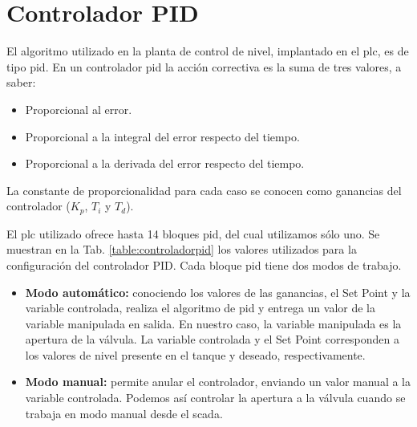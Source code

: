 \section{Controlador PID}
\label{sec:controladorpid}

El algoritmo utilizado en la planta de control de nivel, implantado en el
\gls{plc}, es de tipo \gls{pid}.
En un controlador \gls{pid} la acción correctiva es la suma de tres valores, a
saber:

\begin{itemize}
 \item Proporcional al error.
 \item Proporcional a la integral del error respecto del tiempo.
 \item Proporcional a la derivada del error respecto del tiempo.
\end{itemize}
La constante de proporcionalidad para cada caso se conocen como ganancias del
controlador ($K_p$, $T_i$ y $T_d$).

El \gls{plc} utilizado ofrece hasta 14 bloques \gls{pid}, del cual utilizamos
sólo uno.
Se muestran en la Tab. \ref{table:controladorpid} los valores utilizados para
la configuración del controlador PID.
Cada bloque \gls{pid} tiene dos modos de trabajo.
\begin{itemize}
 \item \textbf{Modo automático:} conociendo los valores de las ganancias, el
Set Point y la variable controlada, realiza el algoritmo de \gls{pid} y entrega
un valor de la variable manipulada en salida.
En nuestro caso, la variable manipulada es la apertura de la válvula.
La variable controlada y el Set Point corresponden a los valores de nivel
presente en el tanque y deseado, respectivamente.
 \item \textbf{Modo manual:} permite anular el controlador, enviando un valor
manual a la variable controlada.
Podemos así controlar la apertura a la válvula cuando se
trabaja en modo manual desde el \gls{scada}.

\end{itemize}

